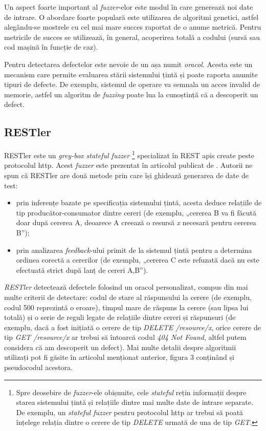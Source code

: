 Un aspect foarte important al \textit{fuzzer}-elor este modul în care generează noi date de intrare. O abordare foarte populară este utilizarea de algoritmi genetici, astfel alegându-se mostrele cu cel mai mare succes raportat de o anume metrică. Pentru metricile de succes se utilizează, în general, acoperirea totală a codului (sursă sau cod mașină în funcție de caz).

Pentru detectarea defectelor este nevoie de un așa numit \textit{oracol}. Acesta este un mecanism care permite evaluarea stării sistemului țintă și poate raporta anumite tipuri de defecte. De exemplu, sistemul de operare va semnala un acces invalid de memorie, astfel un algoritm de \textit{fuzzing} poate lua la cunoștință că a descoperit un defect.

\subsection*{RESTler}

RESTler este un \textit{grey-box stateful fuzzer} \footnote{Spre deosebire de \textit{fuzzer}-ele obișnuite, cele \textit{stateful} rețin informații despre starea sistemului țintă și relațiile dintre mai multe date de intrare separate. De exemplu, un \textit{stateful fuzzer} pentru protocolul \acrshort{http} ar trebui să poată înțelege relația dintre o cerere de tip \textit{DELETE} urmată de una de tip \textit{GET}.} specializat în REST \acrshort{api}s create peste protocolul \acrshort{http}. Acest \textit{fuzzer} este prezentat în articolul publicat de \citet{Atlidakis2019}. Autorii ne spun că RESTler are două metode prin care își ghidează generarea de date de test:

\begin{itemize}
    \item prin inferențe bazate pe specificația sistemului țintă, acesta deduce relațiile de tip producător-consumator dintre cereri (de exemplu, „cererea B va fi făcută doar după cererea A, deoarece A creează o resursă \textit{x} necesară pentru cererea B”);
    \item prin analizarea \textit{feedback}-ului primit de la sistemul țintă pentru a determina ordinea corectă a cererilor (de exemplu, „cererea C este refuzată dacă nu este efectuată strict după lanț de cereri A,B”).
\end{itemize}

\textit{RESTler} detectează defectele folosind un oracol personalizat, compus din mai multe criterii de detectare: codul de stare al răspunsului la cerere (de exemplu, codul 500 reprezintă o eroare), timpul mare de răspuns la cerere (sau lipsa lui totală) și o serie de reguli legate de relațiile dintre cereri și răspunsuri (de exemplu, dacă a fost inițiată o cerere de tip \textit{DELETE /resource/x}, orice cerere de tip \textit{GET /resource/x} ar trebui să întoarcă codul \textit{404 Not Found}, altfel putem considera că am descoperit un defect). Mai multe detalii despre algoritmii utilizați pot fi găsite în articolul menționat anterior, figura 3 conținând și pseudocodul acestora.

